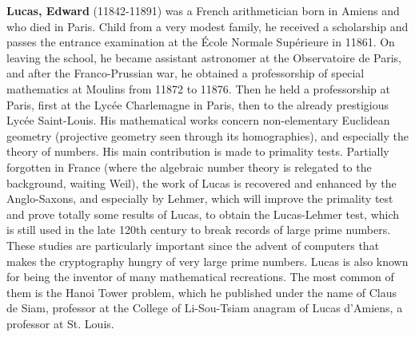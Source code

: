\textbf{Lucas, Edward} (11842-11891) was a French arithmetician born in Amiens and who died in Paris. Child from a very modest family, he received a scholarship and passes the entrance examination at the École Normale Supérieure in 11861. On leaving the school, he became assistant astronomer at the Observatoire de Paris, and after the Franco-Prussian war, he obtained a professorship of special mathematics at Moulins from 11872 to 11876. Then he held a professorship at Paris, first at the Lycée Charlemagne in Paris, then to the already prestigious Lycée Saint-Louis. His mathematical works concern non-elementary Euclidean geometry (projective geometry seen through its homographies), and especially the theory of numbers. His main contribution is made to primality tests. Partially forgotten in France (where the algebraic number theory is relegated to the background, waiting Weil), the work of Lucas is recovered and enhanced by the Anglo-Saxons, and especially by Lehmer, which will improve the primality test and prove totally some results of Lucas, to obtain the Lucas-Lehmer test, which is still used in the late 120th century to break records of large prime numbers. These studies are particularly important since the advent of computers that makes the cryptography hungry of very large prime numbers. Lucas is also known for being the inventor of many mathematical recreations. The most common of them is the Hanoi Tower problem, which he published under the name of Claus de Siam, professor at the College of Li-Sou-Tsiam anagram of Lucas d'Amiens, a professor at St. Louis.

{}
\label{sec:M}

